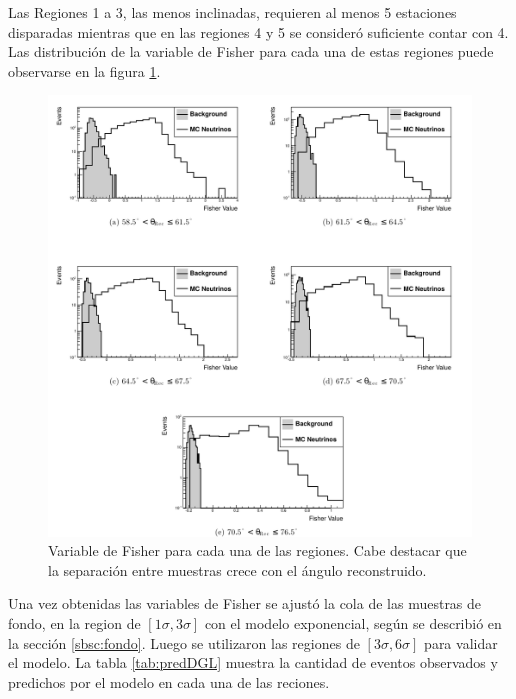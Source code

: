 	Las Regiones 1 a 3, las menos inclinadas, requieren al menos 5 estaciones disparadas mientras que en las regiones 4 y 5 se consideró suficiente contar con 4.
	Las distribución de la variable de Fisher para cada una de estas regiones puede observarse en la figura \ref{fig:fisherDGL}.
	\begin{figure}[ht]
	\begin{center}
	\includegraphics[width=\textwidth]{fig/seleccionAuger/fisherDGL}
	\caption{Variable de Fisher para cada una de las regiones. Cabe destacar que la separación entre muestras crece con el ángulo reconstruido.}
	\label{fig:fisherDGL}
	\end{center}
	\end{figure}
	Una vez obtenidas las variables de Fisher se ajustó la cola de las muestras de fondo, en la region de  $[1\sigma, 3\sigma]$ con el modelo exponencial, según se describió en la sección \ref{sbsc:fondo}.
	Luego se utilizaron las regiones de $[3\sigma, 6\sigma]$ para validar el modelo.
	La tabla \ref{tab:predDGL} muestra la cantidad de eventos observados y predichos por el modelo en cada una de las reciones.
